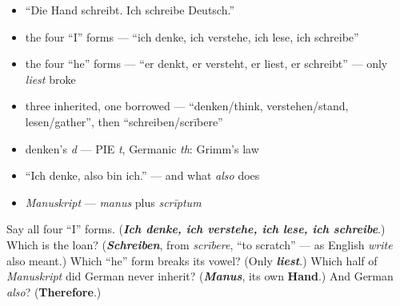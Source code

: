 \begin{itemize}
\raggedright
  \item \textquotedblleft{}Die Hand schreibt. Ich schreibe Deutsch.\textquotedblright{}
  \item the four \textquotedblleft{}I\textquotedblright{} forms — \textquotedblleft{}ich denke, ich verstehe, ich lese, ich schreibe\textquotedblright{}
  \item the four \textquotedblleft{}he\textquotedblright{} forms — \textquotedblleft{}er denkt, er versteht, er liest, er schreibt\textquotedblright{} — only \emph{liest} broke
  \item three inherited, one borrowed — \textquotedblleft{}denken/think, verstehen/stand, lesen/gather\textquotedblright{}, then \textquotedblleft{}schreiben/scrībere\textquotedblright{}
  \item denken's \emph{d} — PIE \emph{t}, Germanic \emph{th}: Grimm's law
  \item \textquotedblleft{}Ich denke, also bin ich.\textquotedblright{} — and what \emph{also} does
  \item \emph{Manuskript} — \emph{manus} plus \emph{scrīptum}
\end{itemize}

\begin{tcolorbox}[breakable,colback=teal!4,colframe=teal!35!black,title={Before you move on}]
Say all four \textquotedblleft{}I\textquotedblright{} forms. (\emph{\textbf{Ich denke, ich verstehe, ich lese, ich schreibe}}.) Which is the loan? (\emph{\textbf{Schreiben}}, from \emph{scrībere}, \textquotedblleft{}to scratch\textquotedblright{} — as English \emph{write} also meant.) Which \textquotedblleft{}he\textquotedblright{} form breaks its vowel? (Only \emph{\textbf{liest}}.) Which half of \emph{Manuskript} did German never inherit? (\emph{\textbf{Manus}}, its own \textbf{Hand}.) And German \emph{also}? (\textbf{Therefore}.)
\end{tcolorbox}
